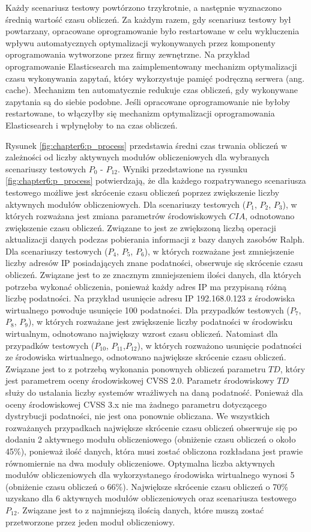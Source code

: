 \bigbreak
Każdy scenariusz testowy powtórzono trzykrotnie, a następnie wyznaczono średnią wartość czasu obliczeń. Za każdym razem, gdy scenariusz testowy był powtarzany, opracowane oprogramowanie było restartowane w celu wykluczenia wpływu automatycznych optymalizacji wykonywanych przez komponenty oprogramowania wytworzone przez firmy zewnętrzne. Na przykład oprogramowanie Elasticsearch ma zaimplementowany mechanizm optymalizacji czasu wykonywania zapytań, który wykorzystuje pamięć podręczną serwera (ang. cache). Mechanizm ten automatycznie redukuje czas obliczeń, gdy wykonywane zapytania są do siebie podobne. Jeśli opracowane oprogramowanie nie byłoby restartowane, to włączyłby się mechanizm optymalizacji oprogramowania Elasticsearch i wpłynęłoby to na czas obliczeń.

\bigbreak
Rysunek \ref{fig:chapter6:p_process} przedstawia średni czas trwania obliczeń w zależności od liczby aktywnych modułów obliczeniowych dla wybranych scenariuszy testowych $P_0$ - $P_{12}$. Wyniki przedstawione na rysunku \ref{fig:chapter6:p_process} potwierdzają, że dla każdego rozpatrywanego scenariusza testowego możliwe jest skrócenie czasu obliczeń poprzez zwiększenie liczby aktywnych modułów obliczeniowych. Dla scenariuszy testowych ($P_1$, $P_2$, $P_3$), w których rozważana jest zmiana parametrów środowiskowych $CIA$, odnotowano zwiększenie czasu obliczeń. Związane to jest ze zwiększoną liczbą operacji aktualizacji danych podczas pobierania informacji z bazy danych zasobów Ralph. Dla scenariuszy testowych ($P_4$, $P_5$, $P_6$), w których rozważane jest zmniejszenie liczby adresów IP posiadających znane podatności, obserwuje się skrócenie czasu obliczeń. Związane jest to ze znacznym zmniejszeniem ilości danych, dla których potrzeba wykonać obliczenia, ponieważ każdy adres IP ma przypisaną różną liczbę podatności. Na przykład usunięcie adresu IP 192.168.0.123 z środowiska wirtualnego powoduje usunięcie 100 podatności. Dla przypadków testowych ($P_7$, $P_8$, $P_9$), w których rozważane jest zwiększenie liczby podatności w środowisku wirtualnym, odnotowano największy wzrost czasu obliczeń. Natomiast dla przypadków testowych ($P_{10}$, $P_{11}$,$P_{12}$), w których rozważono usunięcie podatności ze środowiska wirtualnego, odnotowano największe skrócenie czasu obliczeń. Związane jest to z potrzebą wykonania ponownych obliczeń parametru $TD$, który jest parametrem oceny środowiskowej CVSS 2.0. Parametr środowiskowy $TD$ służy do ustalania liczby systemów wrażliwych na daną podatność. Ponieważ dla oceny środowiskowej CVSS 3.x nie ma żadnego parametru dotyczącego dystrybucji podatności, nie jest ona ponownie obliczana. We wszystkich rozważanych przypadkach największe skrócenie czasu obliczeń obserwuje się po dodaniu 2 aktywnego modułu obliczeniowego (obniżenie czasu obliczeń o około 45\%), ponieważ ilość danych, która musi zostać obliczona rozkładana jest prawie równomiernie na dwa moduły obliczeniowe. Optymalna liczba aktywnych modułów obliczeniowych dla wykorzystanego środowiska wirtualnego wynosi 5 (obniżenie czasu obliczeń o 66\%). Największe skrócenie czasu obliczeń o 70\% uzyskano dla 6 aktywnych modułów obliczeniowych oraz scenariusza testowego $P_{12}$. Związane jest to z najmniejszą ilością danych, które muszą zostać przetworzone przez jeden moduł obliczeniowy.

